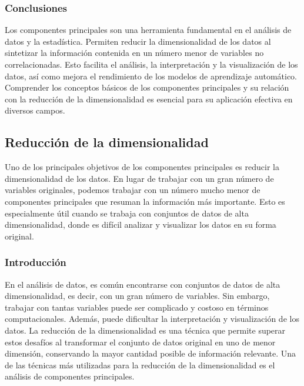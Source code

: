 \documentclass{article}
\begin{document}
\subsubsection*{Conclusiones}
Los componentes principales son una herramienta fundamental en el análisis de datos y la estadística. Permiten reducir la dimensionalidad de los datos al sintetizar la información contenida en un número menor de variables no correlacionadas. Esto facilita el análisis, la interpretación y la visualización de los datos, así como mejora el rendimiento de los modelos de aprendizaje automático. Comprender los conceptos básicos de los componentes principales y su relación con la reducción de la dimensionalidad es esencial para su aplicación efectiva en diversos campos.



\subsection{Reducción de la dimensionalidad}
Uno de los principales objetivos de los componentes principales es reducir la dimensionalidad de los datos. En lugar de trabajar con un gran número de variables originales, podemos trabajar con un número mucho menor de componentes principales que resuman la información más importante. Esto es especialmente útil cuando se trabaja con conjuntos de datos de alta dimensionalidad, donde es difícil analizar y visualizar los datos en su forma original.
\subsubsection{Introducción}
En el análisis de datos, es común encontrarse con conjuntos de datos de alta dimensionalidad, es decir, con un gran número de variables. Sin embargo, trabajar con tantas variables puede ser complicado y costoso en términos computacionales. Además, puede dificultar la interpretación y visualización de los datos. La reducción de la dimensionalidad es una técnica que permite superar estos desafíos al transformar el conjunto de datos original en uno de menor dimensión, conservando la mayor cantidad posible de información relevante. Una de las técnicas más utilizadas para la reducción de la dimensionalidad es el análisis de componentes principales.
\end{document}
